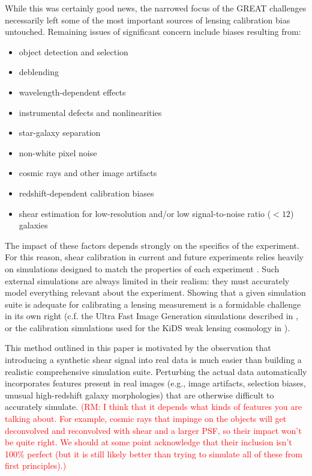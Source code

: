 \documentclass[iop]{emulateapj}
\newcommand\rmcomment[1]{\textcolor{red}{(RM: #1)}}
\begin{document}
While this was certainly good news, the narrowed focus of the GREAT
challenges necessarily left some of the most important sources of
lensing calibration bias untouched. Remaining issues of significant
concern include biases resulting from:
\begin{itemize}
\item object detection and selection
\item deblending
\item wavelength-dependent effects
\item instrumental defects and nonlinearities
\item star-galaxy separation
\item non-white pixel noise
\item cosmic rays and other image artifacts
\item redshift-dependent calibration biases
\item shear estimation for low-resolution and/or low signal-to-noise ratio ($<12$) galaxies
\end{itemize}
The impact of these factors depends strongly on the specifics of the
experiment. For this reason, shear calibration in current and future
experiments relies heavily on simulations designed to match the
properties of each experiment
\citep{KiDS450,2016MNRAS.tmp..827J}. Such external
simulations are always limited in their realism: they must accurately
model everything relevant about the experiment. Showing that a given
simulation suite is adequate for calibrating a lensing measurement is
a formidable challenge in its own right (c.f. the Ultra Fast Image
Generation simulations described in \citealt{2013A&C.....1...23B}, or
the calibration simulations used for the KiDS weak lensing cosmology
in \citealt{2016arXiv160605337F}).

This method outlined in this paper is motivated by the observation that introducing a
synthetic shear signal into real data is much easier than building a
realistic comprehensive simulation suite. Perturbing the actual data
automatically incorporates features present in real images (e.g.,
image artifacts, selection biases, unusual high-redshift galaxy morphologies) that are otherwise difficult to
accurately simulate. \rmcomment{I think that it depends what kinds of features you are talking
  about.  For example, cosmic rays that impinge on the objects will get deconvolved and reconvolved
  with shear and a larger PSF, so their impact won't be quite right.  We should at some point
  acknowledge that their inclusion isn't 100\% perfect (but it is still likely better than trying to
  simulate all of these from first principles).}
\end{document}
